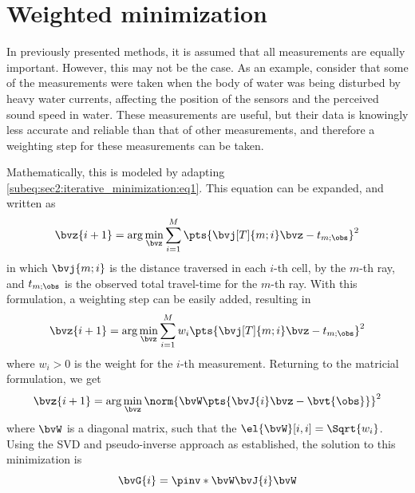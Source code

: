 \section{Weighted minimization}

In previously presented methods, it is assumed that all measurements are equally important. However, this may not be the case. As an example, consider that some of the measurements were taken when the body of water was being disturbed by heavy water currents, affecting the position of the sensors and the perceived sound speed in water. These measurements are useful, but their data is knowingly less accurate and reliable than that of other measurements, and therefore a weighting step for these measurements can be taken.

Mathematically, this is modeled by adapting \cref{subeq:sec2:iterative_minimization:eq1}. This equation can be expanded, and written as
\begin{equation}
	\bvz{i+1} = \arg \min_{\bvz} \sum_{i=1}^{M} \pts{\bvj[T]{m;i} \bvz - t_{m;\obs}}^2
\end{equation}
in which $\bvj{m;i}$ is the distance traversed in each $i$-th cell, by the $m$-th ray, and $t_{m;\obs}$ is the observed total travel-time for the $m$-th ray. With this formulation, a weighting step can be easily added, resulting in
\begin{equation}
	\bvz{i+1} = \arg \min_{\bvz} \sum_{i=1}^{M} w_i \pts{\bvj[T]{m;i} \bvz - t_{m;\obs}}^2
\end{equation}
where $w_i > 0$ is the weight for the $i$-th measurement. Returning to the matricial formulation, we get
\begin{equation}
	\bvz{i+1} = \arg \min_{\bvz} \norm{\bvW \pts{\bvJ{i} \bvz - \bvt{\obs}}}^2
\end{equation}
where $\bvW$ is a diagonal matrix, such that the $\el{\bvW}[i,i] = \Sqrt{w_i}$. Using the SVD and pseudo-inverse approach as established, the solution to this minimization is
\begin{equation}
	\bvG{i} = \pinv*{\bvW \bvJ{i}} \bvW
\end{equation}


